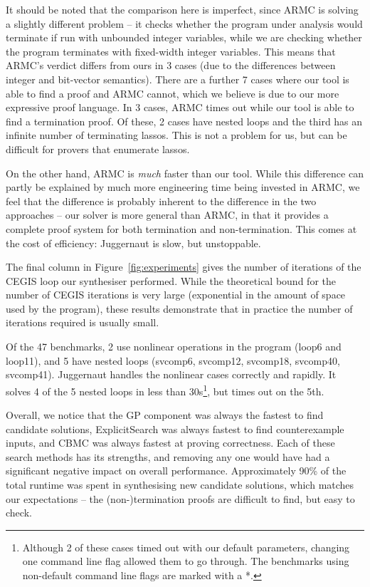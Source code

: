 \documentclass[preprint]{sigplanconf}
\theoremstyle{definition}
\begin{document}
It should be noted that the comparison here is imperfect, since {\sc ARMC}
is solving a slightly different problem -- it checks whether the program
under analysis would terminate if run with unbounded integer variables,
while we are checking whether the program terminates with fixed-width
integer variables.  This means that {\sc ARMC}'s verdict differs from ours
in 3 cases (due to the differences between integer and bit-vector
semantics).  There are a further 7 cases where our tool is able to find a
proof and {\sc ARMC} cannot, which we believe is due to our more expressive
proof language.  In 3 cases, {\sc ARMC} times out while our tool is able to
find a termination proof.  Of these, 2 cases have nested loops and the
third has an infinite number of terminating lassos.  This is not a problem for us,
but can be difficult for provers that enumerate lassos.

On the other hand, {\sc ARMC} is \emph{much} faster than our tool.  While
this difference can partly be explained by much more engineering time being
invested in {\sc ARMC}, we feel that the difference is probably inherent to
the difference in the two approaches -- our solver is more general
than {\sc ARMC}, in that it provides a complete proof system for both
termination and non-termination.  This comes at the cost of efficiency:
{\sc Juggernaut} is slow, but unstoppable.

The final column in Figure~\ref{fig:experiments} gives the number of
iterations of the CEGIS loop our synthesiser performed.  While the
theoretical bound for the number of CEGIS iterations is very large
(exponential in the amount of space used by the program), these results
demonstrate that in practice the number of iterations required is usually
small.

Of the 47 benchmarks, 2 use nonlinear operations in the program (loop6 and loop11),
and 5 have nested loops (svcomp6, svcomp12, svcomp18, svcomp40, svcomp41).
{\sc Juggernaut} handles the nonlinear cases correctly and rapidly.
It solves 4 of the 5 nested loops in less than 30s\footnote{Although
2 of these cases timed out with our default parameters, changing one command
line flag allowed them to go through.  The benchmarks using non-default
command line flags are marked with a *.}, but times out on the 5th.

Overall, we notice that the GP component was always the fastest to find
candidate solutions, {\sc ExplicitSearch} was always fastest
to find counterexample inputs, and {\sc CBMC} was always fastest at
proving correctness.  Each of these search methods has its strengths,
and removing any one would have had a significant negative impact on
overall performance.  Approximately 90\% of the total
runtime was spent in synthesising new candidate solutions, which matches
our expectations -- the (non-)termination proofs are difficult to
find, but easy to check.
\end{document}
